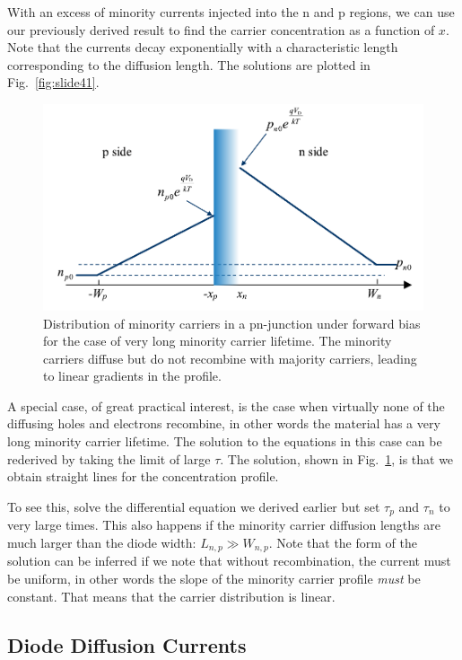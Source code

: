 With an excess of minority currents injected into the n and p regions, we can use our previously derived result to find the carrier concentration as a function of $x$.  Note that the currents decay exponentially with a characteristic length corresponding to the diffusion length.  The solutions are plotted in Fig.~\ref{fig:slide41}.
 

\begin{figure}[tb]
\begin{center}
\includegraphics[width=.75\columnwidth]{slide42}
\end{center}
\caption{Distribution of minority carriers in a pn-junction under forward bias for the case of very long minority carrier lifetime.  The minority carriers diffuse but do not recombine with majority carriers, leading to linear gradients in the profile. } \label{fig:slide42}
\end{figure}

A special case, of great practical interest, is the case when virtually none of the diffusing holes and electrons recombine, in other words the material has a very long minority carrier lifetime.  The solution to the equations in this case can be rederived by taking the limit of large $\tau$.  The solution, shown in Fig.~\ref{fig:slide42}, is that we obtain straight lines for the concentration profile.

To see this, solve the differential equation we derived earlier but set $\tau_p$ and $\tau_n$ to very large times.  This also happens if the minority carrier diffusion lengths are much larger than the diode width: $ {L_{n,p}} \gg {W_{n,p}} $.  Note that the form of the solution can be inferred if we note that without recombination, the current must be uniform, in other words the slope of the minority carrier profile \emph{must} be constant. That means that the carrier distribution is linear.



\subsection{Diode Diffusion Currents}

